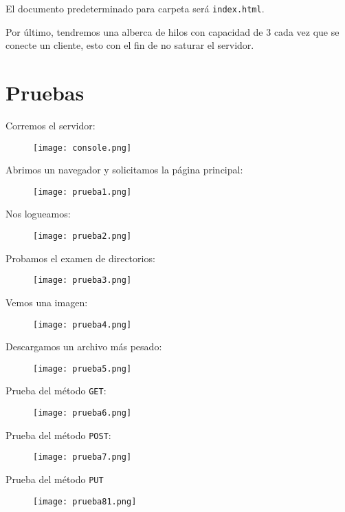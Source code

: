 \documentclass[15pt]{article}
\begin{document}
		El documento predeterminado para carpeta será \texttt{index.html}.
		
		Por último, tendremos una alberca de hilos con capacidad de 3 cada vez que se conecte un cliente, esto con el fin de no saturar el servidor.
	
	\clearpage
	\section{Pruebas}
		Corremos el servidor:
		\begin{figure}[H]
			\centering
			\texttt{[image: console.png]}
		\end{figure}
		
		\clearpage
		Abrimos un navegador y solicitamos la página principal:
		\begin{figure}[H]
			\centering
			\texttt{[image: prueba1.png]}
		\end{figure}
		
		\clearpage
		Nos logueamos:
		\begin{figure}[H]
			\centering
			\texttt{[image: prueba2.png]}
		\end{figure}
		
		\clearpage
		Probamos el examen de directorios:
		\begin{figure}[H]
			\centering
			\texttt{[image: prueba3.png]}
		\end{figure}
		
		\clearpage
		Vemos una imagen:
		\begin{figure}[H]
			\centering
			\texttt{[image: prueba4.png]}
		\end{figure}
		
		\clearpage
		Descargamos un archivo más pesado:
		\begin{figure}[H]
			\centering
			\texttt{[image: prueba5.png]}
		\end{figure}
		
		\clearpage
		Prueba del método \texttt{GET}:
		\begin{figure}[H]
			\centering
			\texttt{[image: prueba6.png]}
		\end{figure}
		
		\clearpage
		Prueba del método \texttt{POST}:
		\begin{figure}[H]
			\centering
			\texttt{[image: prueba7.png]}
		\end{figure}
		
		\clearpage
		Prueba del método \texttt{PUT}
		\begin{figure}[H]
			\centering
			\texttt{[image: prueba81.png]}
		\end{figure}
	
\end{document}
